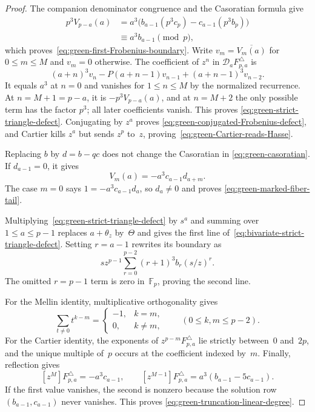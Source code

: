 \begin{proof}
The companion denominator congruence and the Casoratian formula give
\begin{align*}
 p^3V_{p-a}(a)
 &=a^3\bigl(b_{a-1}(p^3c_p)-c_{a-1}(p^3b_p)\bigr)\\
 &\equiv a^3b_{a-1}\pmod p,
\end{align*}
which proves~\eqref{eq:green-first-Frobenius-boundary}.  Write
$v_m=\overline{V_m(a)}$ for $0\leq m\leq M$ and $v_m=0$ otherwise.
The coefficient of $z^n$ in $\mathscr D_aF_{p,a}^{\triangle}$ is
\begin{equation}
 (a+n)^3v_n-P(a+n-1)v_{n-1}+(a+n-1)^3v_{n-2}.
 \label{eq:green-defect-coefficient}
\end{equation}
It equals $a^3$ at $n=0$ and vanishes for $1\leq n\leq M$ by the
normalized recurrence.  At $n=M+1=p-a$, it is
$-p^3V_{p-a}(a)$, and at $n=M+2$ the only possible term has the factor
$p^3$; all later coefficients vanish.  This proves
\eqref{eq:green-strict-triangle-defect}.  Conjugating by $z^a$ proves
\eqref{eq:green-conjugated-Frobenius-defect}, and Cartier kills $z^a$ but
sends $z^p$ to~$z$, proving~\eqref{eq:green-Cartier-reads-Hasse}.

Replacing $b$ by $d=b-qc$ does not change the Casoratian in
\eqref{eq:green-casoratian}.  If $d_{a-1}=0$, it gives
\[
 V_m(a)=-a^3c_{a-1}d_{a+m}.
\]
The case $m=0$ says $1=-a^3c_{a-1}d_a$, so $d_a\ne0$ and proves
\eqref{eq:green-marked-fiber-tail}.

Multiplying~\eqref{eq:green-strict-triangle-defect} by $s^a$ and summing
over $1\leq a\leq p-1$ replaces $a+\theta_z$ by~$\Theta$ and gives the
first line of~\eqref{eq:bivariate-strict-triangle-defect}.  Setting
$r=a-1$ rewrites its boundary as
\[
 sz^{p-1}\sum_{r=0}^{p-2}(r+1)^3b_r(s/z)^r.
\]
The omitted $r=p-1$ term is zero in~$\mathbb F_p$, proving the second
line.

For the Mellin identity, multiplicative orthogonality gives
\[
 \sum_{t\ne0}t^{k-m}
 =\begin{cases}-1,&k=m,\\0,&k\ne m,
 \end{cases}
 \qquad(0\leq k,m\leq p-2).
\]
For the Cartier identity, the exponents of
$z^{p-m}F_{p,a}^{\triangle}$ lie strictly between~$0$ and~$2p$, and the
unique multiple of~$p$ occurs at the coefficient indexed by~$m$.
Finally, reflection gives
\[
 [z^M]F_{p,a}^{\triangle}=-a^3c_{a-1},
 \qquad
 [z^{M-1}]F_{p,a}^{\triangle}
 =a^3(b_{a-1}-5c_{a-1}).
\]
If the first value vanishes, the second is nonzero because the solution row
$(b_{a-1},c_{a-1})$ never vanishes.  This proves
\eqref{eq:green-truncation-linear-degree}.
\end{proof}

